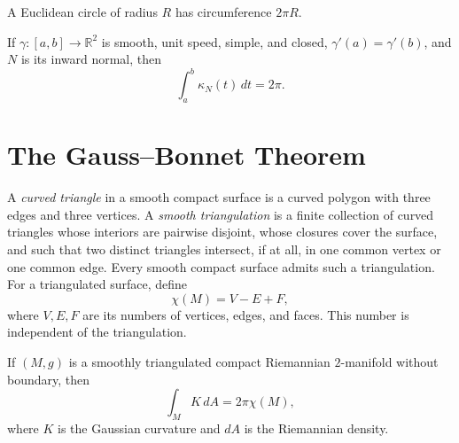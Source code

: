 \begin{corollary}
\label{cor:circumference-theorem}
A Euclidean circle of radius $R$ has circumference $2\pi R$.
\end{corollary}

\begin{corollary}
\label{cor:total-curvature-theorem}
If $\gamma:[a,b]\to\mathbb R^2$ is smooth, unit speed, simple, and closed,
$\gamma'(a)=\gamma'(b)$, and $N$ is its inward normal, then
\[
\int_a^b\kappa_N(t)\,dt=2\pi.
\]
\end{corollary}
\section{The Gauss--Bonnet Theorem}

A \emph{curved triangle} in a smooth compact surface is a curved polygon with
three edges and three vertices. A \emph{smooth triangulation} is a finite
collection of curved triangles whose interiors are pairwise disjoint, whose
closures cover the surface, and such that two distinct triangles intersect, if
at all, in one common vertex or one common edge. Every smooth compact surface
admits such a triangulation. For a triangulated surface, define
\[
\chi(M)=V-E+F,
\]
where $V,E,F$ are its numbers of vertices, edges, and faces. This number is
independent of the triangulation.

\begin{theorem}
\label{thm:gauss-bonnet-theorem}
If $(M,g)$ is a smoothly triangulated compact Riemannian $2$-manifold without
boundary, then
\[
\int_MK\,dA=2\pi\chi(M),
\]
where $K$ is the Gaussian curvature and $dA$ is the Riemannian density.
\end{theorem}

